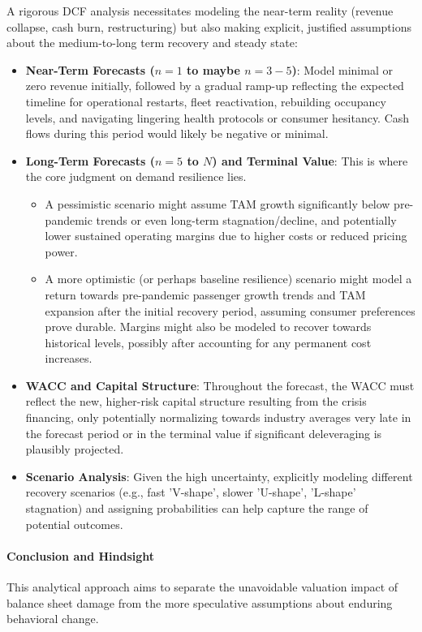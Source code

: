A rigorous DCF analysis necessitates modeling the near-term reality (revenue collapse, cash burn, restructuring) but also making explicit, justified assumptions about the medium-to-long term recovery and steady state:
\begin{itemize}
    \item \textbf{Near-Term Forecasts (\(n=1\) to maybe \(n=3-5\))}: Model minimal or zero revenue initially, followed by a gradual ramp-up reflecting the expected timeline for operational restarts, fleet reactivation, rebuilding occupancy levels, and navigating lingering health protocols or consumer hesitancy. Cash flows during this period would likely be negative or minimal.
    \item \textbf{Long-Term Forecasts (\(n=5\) to \(N\)) and Terminal Value}: This is where the core judgment on demand resilience lies.
          \begin{itemize}
              \item A pessimistic scenario might assume TAM growth significantly below pre-pandemic trends or even long-term stagnation/decline, and potentially lower sustained operating margins due to higher costs or reduced pricing power.
              \item A more optimistic (or perhaps baseline resilience) scenario might model a return towards pre-pandemic passenger growth trends and TAM expansion after the initial recovery period, assuming consumer preferences prove durable. Margins might also be modeled to recover towards historical levels, possibly after accounting for any permanent cost increases.
          \end{itemize}
    \item \textbf{WACC and Capital Structure}: Throughout the forecast, the WACC must reflect the new, higher-risk capital structure resulting from the crisis financing, only potentially normalizing towards industry averages very late in the forecast period or in the terminal value if significant deleveraging is plausibly projected.
    \item \textbf{Scenario Analysis}: Given the high uncertainty, explicitly modeling different recovery scenarios (e.g., fast 'V-shape', slower 'U-shape', 'L-shape' stagnation) and assigning probabilities can help capture the range of potential outcomes.
\end{itemize}

\paragraph{Conclusion and Hindsight}
This analytical approach aims to separate the unavoidable valuation impact of balance sheet damage from the more speculative assumptions about enduring behavioral change.

